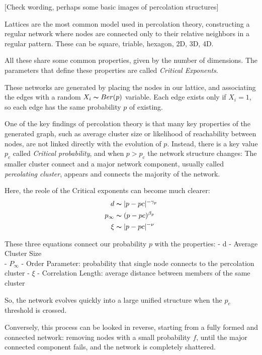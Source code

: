 \documentclass[
]{article}
\begin{document}
{[}Check wording, perhaps some basic images of percolation structures{]}

Lattices are the most common model used in percolation theory,
constructing a regular network where nodes are connected only to their
relative neighbors in a regular pattern. These can be square, triable,
hexagon, 2D, 3D, 4D.

All these share some common properties, given by the number of
dimensions. The parameters that define these properties are called
\emph{Critical Exponents}.

These networks are generated by placing the nodes in our lattice, and
associating the edges with a random \(X_i \thicksim Ber(p)\) variable.
Each edge exists only if \(X_i = 1\), so each edge has the same
probability \(p\) of existing.

One of the key findings of percolation theory is that many key
properties of the generated graph, such as average cluster size or
likelihood of reachability between nodes, are not linked directly with
the evolution of \(p\). Instead, there is a key value \(p_c\) called
\emph{Critical probability}, and when \(p>p_c\) the network structure
changes: The smaller cluster connect and a major network component,
usually called \emph{percolating cluster}, appears and connects the
majority of the network.

Here, the reole of the Critical exponents can become much clearer: \[
\begin{aligned}
d &\thicksim \lvert p-pc \lvert ^{-\gamma_p} \\
p_{\infty}&\thicksim(p-pc)^{\beta_p} \\
\xi&\thicksim \lvert p-pc \lvert ^{-\nu}
\end{aligned}
\]

These three equations connect our probability \(p\) with the properties:
- d - Average Cluster Size\\
- \(P_\infty\) - Order Parameter: probability that single node connects
to the percolation cluster - \(\xi\) - Correlation Length: average
distance between members of the same cluster

So, the network evolves quickly into a large unified structure when the
\(p_c\) threshold is crossed.

Conversely, this process can be looked in reverse, starting from a fully
formed and connected network: removing nodes with a small probability
\(f\), until the major connected component fails, and the network is
completely shattered.
\end{document}
